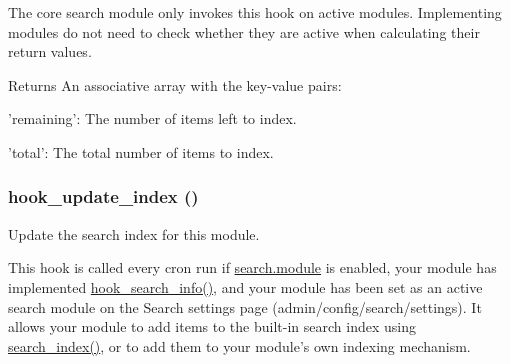 The core search module only invokes this hook on active modules. Implementing modules do not need to check whether they are active when calculating their return values.

\begin{DoxyReturn}{Returns}
An associative array with the key-\/value pairs:
\begin{DoxyItemize}
\item 'remaining': The number of items left to index.
\item 'total': The total number of items to index. 
\end{DoxyItemize}
\end{DoxyReturn}
\hypertarget{group__search_ga23d6f6642bd53c4f033f10e9c1b12d43}{
\subsubsection[{hook\_\-update\_\-index}]{\setlength{\rightskip}{0pt plus 5cm}hook\_\-update\_\-index ()}}
\label{group__search_ga23d6f6642bd53c4f033f10e9c1b12d43}
Update the search index for this module.

This hook is called every cron run if \hyperlink{search_8module}{search.module} is enabled, your module has implemented \hyperlink{group__search_ga37b761616f2cad4796891008f2b374f3}{hook\_\-search\_\-info()}, and your module has been set as an active search module on the Search settings page (admin/config/search/settings). It allows your module to add items to the built-\/in search index using \hyperlink{group__search_ga57ab9f6e1c404a8c248293e554373ae6}{search\_\-index()}, or to add them to your module's own indexing mechanism.

